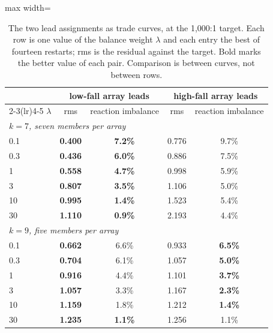 \documentclass[preprint,12pt,number]{elsarticle}
\begin{document}
\begin{table}[H]
\centering
\caption{The two lead assignments as trade curves, at the 1,000:1 target. Each row is one value of the balance weight $\lambda$ and each entry the best of fourteen restarts; rms is the residual against the target. Bold marks the better value of each pair. Comparison is between curves, not between rows.}
\label{tab:leadorder}
\footnotesize
\begin{adjustbox}{max width=\linewidth}
\begin{tabular}{lcccc}
\toprule
& \multicolumn{2}{c}{low-fall array leads} & \multicolumn{2}{c}{high-fall array leads} \\
\cmidrule(lr){2-3}\cmidrule(lr){4-5}
$\lambda$ & rms & reaction imbalance & rms & reaction imbalance \\
\midrule
\multicolumn{5}{l}{\emph{$k=7$, seven members per array}}\\
0.1  & \textbf{0.400} & \textbf{7.2\%} & 0.776 & 9.7\% \\
0.3  & \textbf{0.436} & \textbf{6.0\%} & 0.886 & 7.5\% \\
1    & \textbf{0.558} & \textbf{4.7\%} & 0.998 & 5.9\% \\
3    & \textbf{0.807} & \textbf{3.5\%} & 1.106 & 5.0\% \\
10   & \textbf{0.995} & \textbf{1.4\%} & 1.523 & 5.4\% \\
30   & \textbf{1.110} & \textbf{0.9\%} & 2.193 & 4.4\% \\
\midrule
\multicolumn{5}{l}{\emph{$k=9$, five members per array}}\\
0.1  & \textbf{0.662} & 6.6\% & 0.933 & \textbf{6.5\%} \\
0.3  & \textbf{0.704} & 6.1\% & 1.057 & \textbf{5.0\%} \\
1    & \textbf{0.916} & 4.4\% & 1.101 & \textbf{3.7\%} \\
3    & \textbf{1.057} & 3.3\% & 1.167 & \textbf{2.3\%} \\
10   & \textbf{1.159} & 1.8\% & 1.212 & \textbf{1.4\%} \\
30   & \textbf{1.235} & \textbf{1.1\%} & 1.256 & 1.1\% \\
\bottomrule
\end{tabular}
\end{adjustbox}
\end{table}
\end{document}
